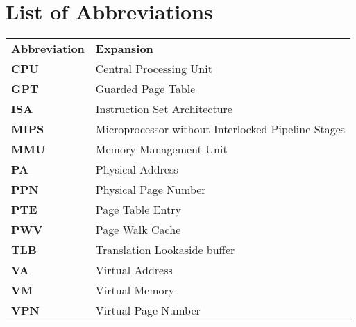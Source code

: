 
\chapter{List of Abbreviations}
\label{appendixa}

\begin{tabular}{l l}
    \textbf{Abbreviation} & \textbf{Expansion}                                 \\
    \textbf{CPU}          & Central Processing Unit                            \\
    \textbf{GPT}          & Guarded Page Table                                 \\
    \textbf{ISA}          & Instruction Set Architecture                       \\
    \textbf{MIPS}         & Microprocessor without Interlocked Pipeline Stages \\
    \textbf{MMU}          & Memory Management Unit                             \\
    \textbf{PA}           & Physical Address                                   \\
    \textbf{PPN}          & Physical Page Number                               \\
    \textbf{PTE}          & Page Table Entry                                   \\
    \textbf{PWV}          & Page Walk Cache                                    \\
    \textbf{TLB}          & Translation Lookaside buffer                       \\
    \textbf{VA}           & Virtual Address                                    \\
    \textbf{VM}           & Virtual Memory                                     \\
    \textbf{VPN}          & Virtual Page Number                                \\
\end{tabular}
